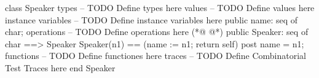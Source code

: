 \begin{vdmpp}[breaklines=true]
class Speaker
types
-- TODO Define types here
values
-- TODO Define values here
instance variables
-- TODO Define instance variables here
  public name: seq of char;
operations
-- TODO Define operations here
(*@
\label{Speaker:11}
@*)
  public Speaker: seq of char ==> Speaker
 Speaker(n1) == (name := n1; return self)
 post name = n1;
functions
-- TODO Define functiones here
traces
-- TODO Define Combinatorial Test Traces here
end Speaker
\end{vdmpp}
